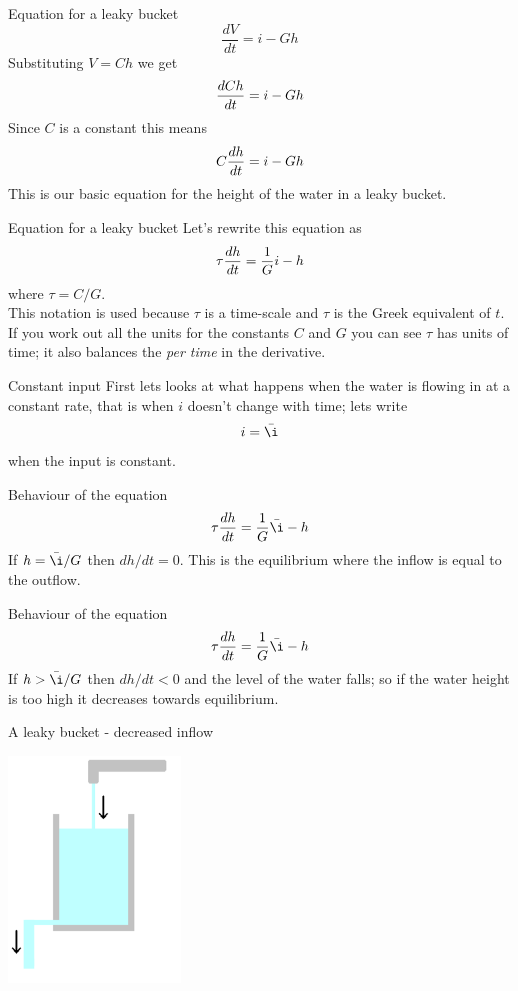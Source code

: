 \documentclass{beamer}
\newcommand{\crish}{\color{reddish}}
\newcommand{\cbla}{\color{black}}
\newcommand{\cblu}{\color{blue}}
\begin{document}
\begin{frame}{Equation for a leaky bucket}
  \crish
  $$\frac{dV}{dt}=i-Gh$$
  \cbla{}Substituting \cblu$V=Ch$\cbla{} we get\crish
  $$\frac{d\cblu Ch\crish}{dt}=i-Gh$$
  \cbla{}Since \crish$C$\cbla{} is a constant this means\crish
  $$\cblu{}C\crish\frac{d\cblu{}h\crish}{dt}=i-Gh$$\cbla
  This is our basic equation for the height of the water in a leaky bucket.
\end{frame}


\begin{frame}{Equation for a leaky bucket}
  Let's rewrite this equation as 
  \crish
  $$\cblu\tau\crish\frac{dh}{dt}=\frac{1}{G}i-h$$\cbla where
  \cblu$\tau=C/G$\cbla{}.\\[1cm]
  This notation is used because
  \cblu$\tau$\cbla{} is a time-scale and \crish$\tau$\cbla{} is the
  Greek equivalent of \crish$t$\cbla. If you work out all the units for the constants \crish$C$\cbla{} and \crish$G$\cbla{} you can see \cblu$\tau$\cbla{} has units of time; it also balances the \textsl{per time} in the derivative. 
\end{frame}

\begin{frame}{Constant input}
  First lets looks at what happens when the water is flowing in at a constant rate, that is when \crish$i$\cbla{} doesn't change with time; lets write\cblu{}
  $$i=\bar{\i}$$\cbla{} when the input is constant.
\end{frame}

\begin{frame}{Behaviour of the equation}
  \crish
  $$\tau\frac{dh}{dt}=\frac{1}{G}\bar{\i}-h$$\cbla If
  \cblu{}$h=\bar{\i}/G$\cbla{} then \cblu{}$dh/dt=0$\cbla{}. This is
  the equilibrium where the inflow is equal to the outflow.
\end{frame}

\begin{frame}{Behaviour of the equation}
  \crish
  $$\tau\frac{dh}{dt}=\frac{1}{G}\bar{\i}-h$$\cbla If
  \cblu{}$h>\bar{\i}/G$\cbla{} then \cblu{}$dh/dt<0$\cbla{} and the
  level of the water falls; so if the water height is too high it
  decreases towards equilibrium.
\end{frame}


\begin{frame}{A leaky bucket - decreased inflow}

  \begin{center}
    \includegraphics[height=6cm]{glass_tap_down.png}
  \end{center}
  
  
\end{frame}
\end{document}

